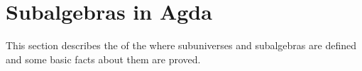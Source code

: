 \documentclass[a4paper,UKenglish,cleveref, autoref, thm-restate]{lipics-v2019}
\begin{document}
\begin{comment}
  \subsection{Compatibility of terms}\label{compatibility-of-terms}
  In this section we present the formal proof of the fact that homomorphisms commute with terms. More precisely, if 𝑨 and 𝑩 are 𝑆-algebras, h : 𝑨 → 𝑩 a homomorphism, and t a term in the language of 𝑆, then for all a : X → ∣ 𝑨 ∣ we have \(h (t^{𝑨} a) = t^{𝑩} (h ∘ a)\).

  \subsubsection{Homomorphisms commute with terms}\label{homomorphisms-commute-with-terms}

  \begin{code}\end{code}


  \subsubsection{Congruences commute with terms}\label{congruences-commute-with-terms}

  Rounding out this section is an formal proof of the fact that terms respect congruences. More precisely, we show that for every term \texttt{t}, every \texttt{θ\ ∈\ Con(𝑨)}, and all tuples \texttt{a,\ b\ :\ 𝑋\ →\ A}, we have


  TODO

\end{comment}

\section{Subalgebras in Agda}\label{sec:subs-in-agda}
This section describes the \subsmodule of the \agdaualib where subuniverses and subalgebras are defined and some basic facts about them are proved.

\end{document}

